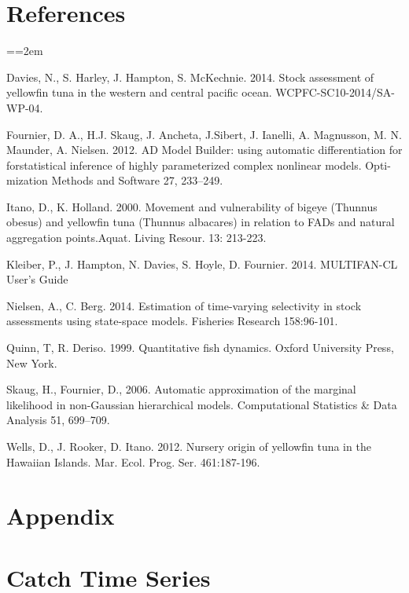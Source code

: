 \documentclass[12pt,letterpaper,twoside]{article}
\newcommand\doublespacing{\baselineskip=1.6\normalbaselineskip}
\begin{document}
\section*{References}
{\parindent=0cm \small
\everypar={\hangindent=2em }\par
\doublespacing

Davies, N., S. Harley, J. Hampton, S. McKechnie. 2014. Stock
assessment of yellowfin tuna in the western and central pacific ocean.
WCPFC-SC10-2014/SA-WP-04.

Fournier, D. A., H.J. Skaug, J. Ancheta, J.Sibert, J. Ianelli, 
A. Magnusson, M. N. Maunder, A. Nielsen. 2012. AD Model Builder:
using automatic differentiation for forstatistical inference of highly
parameterized complex nonlinear models. Opti-mization Methods and
Software 27, 233–249.

Itano, D., K. Holland. 2000.  Movement and vulnerability of bigeye
(Thunnus obesus) and yellowfin tuna (Thunnus albacares) in relation to
FADs and natural aggregation points.Aquat. Living Resour. 13: 213-223.

Kleiber, P., J. Hampton, N. Davies, S. Hoyle, D. Fournier. 2014.
MULTIFAN-CL User’s Guide

Nielsen, A., C. Berg. 2014. Estimation of time-varying selectivity
in stock assessments using state-space models. Fisheries Research
158:96-101.

Quinn, T, R. Deriso. 1999. Quantitative fish dynamics. Oxford
University Press, New York.

Skaug, H., Fournier, D., 2006. Automatic approximation of the marginal
likelihood in non-Gaussian hierarchical models. Computational
Statistics \& Data Analysis 51, 699–709.

Wells, D., J. Rooker, D. Itano. 2012.  Nursery origin of yellowfin
tuna in the Hawaiian Islands. Mar. Ecol. Prog. Ser. 461:187-196. 
\par}

\clearpage


\section*{Appendix}
\appendix


\section{Catch Time Series}
\label{sec:data}
\end{document}
